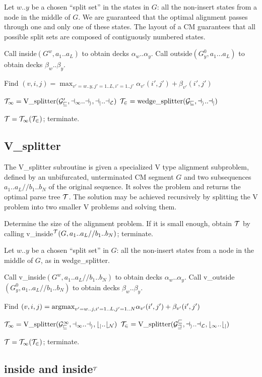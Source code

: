 \documentclass[11pt]{article}
\def\argmax{\mbox{\rm{argmax}}}      %
\begin{document}
Let $w..y$ be a chosen ``split set'' in the states in $G$: all the
non-insert states from a node in the middle of $G$. We are guaranteed
that the optimal alignment passes through one and only one of these
states. The layout of a CM guarantees that all possible split sets are
composed of contiguously numbered states.

Call inside$(G^w, a_1..a_L)$ to obtain decks $\alpha_w..\alpha_y$.  
Call outside$(G^0_y, a_1...a_L)$ to obtain decks $\beta_w..\beta_y$.

Find $(v,i,j) = \max_{v'=w..y, j'=1..L, i'=1..j'} \alpha_{v'}(i',j') + \beta_{v'}(i',j')$

$\cal{T}_1 = \mbox{V\_splitter}(G^0_v, a_1..a_i, a_j..a_L)$
$\cal{T}_2 = \mbox{wedge\_splitter}(G_v, a_i..a_j)$

$\cal{T} = \cal{T}_1 (\cal{T}_2)$; terminate.

\subsection{V\_splitter}

The V\_splitter subroutine is given a specialized V type alignment
subproblem, defined by an unbifurcated, unterminated CM segment $G$
and two subsequences $a_1..a_L//b_1..b_N$ of the original sequence. It
solves the problem and returns the optimal parse tree $\cal{T}$. The
solution may be achieved recursively by splitting the V problem into
two smaller V problems and solving them.

Determine the size of the alignment problem. If it is small enough,
obtain $\cal{T}$ by calling v\_inside$^{\cal{T}}(G, a_1..a_L//b_1..b_N)$;
terminate.

Let $w..y$ be a chosen ``split set'' in $G$: all the non-insert states
from a node in the middle of $G$, as in wedge\_splitter.

Call v\_inside$(G^w, a_1..a_L//b_1..b_N)$ to obtain decks $\alpha_w..\alpha_y$.
Call v\_outside$(G^0_y, a_1..a_L//b_1..b_N)$ to obtain decks $\beta_w..\beta_y$.

Find $(v,i,j) = \argmax_{v'=w..j, i'=1..L, j'=1..N} \alpha_{v'}(i',j') + \beta_{v'}(i',j')$

$\cal{T}_1 = \mbox{V\_splitter}(G^1_v, a_1..a_i, b_j..b_N)$
$\cal{T}_2 = \mbox{V\_splitter}(G^v_w, a_i..a_L, b_1..b_j)$

$\cal{T} = \cal{T}_1 (\cal{T}_2)$; terminate.

\subsection{inside and inside$^{\cal{T}}$}
\end{document}
